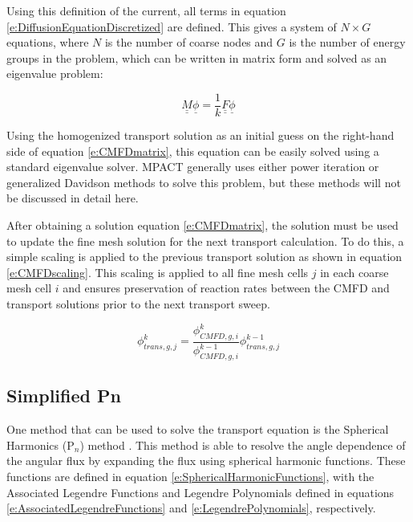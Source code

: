 Using this definition of the current, all terms in equation \ref{e:DiffusionEquationDiscretized} are defined.  This gives a system of $N\times G$ equations, where $N$ is the number of coarse nodes and $G$ is the number of energy groups in the problem, which can be written in matrix form and solved as an eigenvalue problem:

\begin{equation}\label{e:CMFDmatrix}
\underline{\underline{M}}\underline{\phi}=\frac{1}{k}\underline{\underline{F}}\underline{\phi}
\end{equation}

Using the homogenized transport solution as an initial guess on the right-hand side of equation \ref{e:CMFDmatrix}, this equation can be easily solved using a standard eigenvalue solver.  MPACT generally uses either power iteration or generalized Davidson methods to solve this problem, but these methods will not be discussed in detail here.

After obtaining a solution equation \ref{e:CMFDmatrix}, the solution must be used to update the fine mesh solution for the next transport calculation.  To do this, a simple scaling is applied to the previous transport solution as shown in equation \ref{e:CMFDscaling}.  This scaling is applied to all fine mesh cells $j$ in each coarse mesh cell $i$ and ensures preservation of reaction rates between the CMFD and transport solutions prior to the next transport sweep.

\begin{equation}\label{e:CMFDscaling}
\phi_{trans,g,j}^{k}=\frac{\phi_{CMFD,g,i}^k}{\phi_{CMFD,g,i}^{k-1}}\phi_{trans,g,j}^{k-1}
\end{equation}


\subsection{Simplified Pn}

One method that can be used to solve the transport equation is the Spherical Harmonics (P$_n$) method \cite{SPnEquations}.  This method is able to resolve the angle dependence of the angular flux by expanding the flux using spherical harmonic functions.  These functions are defined in equation \ref{e:SphericalHarmonicFunctions}, with the Associated Legendre Functions and Legendre Polynomials defined in equations \ref{e:AssociatedLegendreFunctions} and \ref{e:LegendrePolynomials}, respectively.


